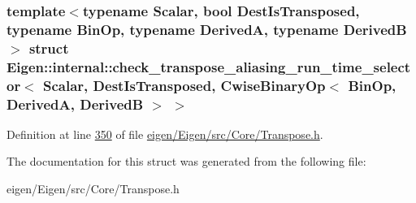 \subsubsection*{template$<$typename Scalar, bool Dest\+Is\+Transposed, typename Bin\+Op, typename DerivedA, typename DerivedB$>$\newline
struct Eigen\+::internal\+::check\+\_\+transpose\+\_\+aliasing\+\_\+run\+\_\+time\+\_\+selector$<$ Scalar, Dest\+Is\+Transposed, Cwise\+Binary\+Op$<$ Bin\+Op, Derived\+A, Derived\+B $>$ $>$}



Definition at line \hyperlink{eigen_2_eigen_2src_2_core_2_transpose_8h_source_l00350}{350} of file \hyperlink{eigen_2_eigen_2src_2_core_2_transpose_8h_source}{eigen/\+Eigen/src/\+Core/\+Transpose.\+h}.



The documentation for this struct was generated from the following file\+:\begin{DoxyCompactItemize}
\item 
eigen/\+Eigen/src/\+Core/\+Transpose.\+h\end{DoxyCompactItemize}
